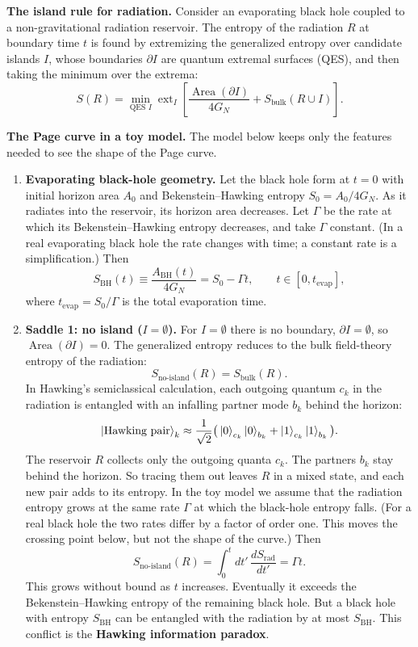 \begin{keyresult}
\textbf{The island rule for radiation.} Consider an evaporating black hole coupled to a non-gravitational
radiation reservoir. The entropy of the radiation $R$ at boundary time $t$ is found by extremizing the
generalized entropy over candidate islands $I$, whose boundaries $\partial I$ are quantum extremal surfaces
(QES), and then taking the minimum over the extrema:
\[
S(R) = \min_{\text{QES } I} \operatorname{ext}_I \left[ \frac{\operatorname{Area}(\partial I)}{4G_N}
+ S_{\text{bulk}}(R \cup I) \right] .
\]

\textbf{The Page curve in a toy model.} The model below keeps only the features needed to see the shape of the
Page curve.
\begin{enumerate}[leftmargin=*]
\item \textbf{Evaporating black-hole geometry.}
Let the black hole form at $t = 0$ with initial horizon area $A_0$ and Bekenstein--Hawking entropy
$S_0 = A_0/4G_N$. As it radiates into the reservoir, its horizon area decreases. Let $\Gamma$ be the rate at
which its Bekenstein--Hawking entropy decreases, and take $\Gamma$ constant. (In a real evaporating black hole
the rate changes with time; a constant rate is a simplification.) Then
\[
S_{\text{BH}}(t) \equiv \frac{A_{\text{BH}}(t)}{4G_N} = S_0 - \Gamma t, \qquad t \in [0, t_{\text{evap}}] ,
\]
where $t_{\text{evap}} = S_0/\Gamma$ is the total evaporation time.

\item \textbf{Saddle 1: no island ($I = \emptyset$).}
For $I = \emptyset$ there is no boundary, $\partial I = \emptyset$, so $\operatorname{Area}(\partial I) = 0$.
The generalized entropy reduces to the bulk field-theory entropy of the radiation:
\[
S_{\text{no-island}}(R) = S_{\text{bulk}}(R) .
\]
In Hawking's semiclassical calculation, each outgoing quantum $c_k$ in the radiation is entangled with an
infalling partner mode $b_k$ behind the horizon:
\[
\ket{\text{Hawking pair}}_k \approx \frac{1}{\sqrt{2}}\big(\ket{0}_{c_k}\ket{0}_{b_k}
+ \ket{1}_{c_k}\ket{1}_{b_k}\big) .
\]
The reservoir $R$ collects only the outgoing quanta $c_k$. The partners $b_k$ stay behind the horizon. So
tracing them out leaves $R$ in a mixed state, and each new pair adds to its entropy. In the toy model we assume
that the radiation entropy grows at the same rate $\Gamma$ at which the black-hole entropy falls. (For a real
black hole the two rates differ by a factor of order one. This moves the crossing point below, but not the
shape of the curve.) Then
\[
S_{\text{no-island}}(R) = \int_0^t dt' \, \frac{dS_{\text{rad}}}{dt'} = \Gamma t .
\]
This grows without bound as $t$ increases. Eventually it exceeds the Bekenstein--Hawking entropy of the
remaining black hole. But a black hole with entropy $S_{\text{BH}}$ can be entangled with the radiation by at
most $S_{\text{BH}}$. This conflict is the \textbf{Hawking information paradox}.


\end{enumerate}
\end{keyresult}

